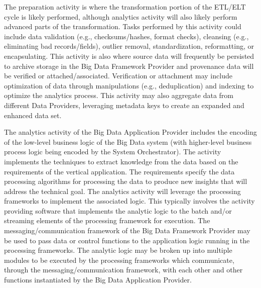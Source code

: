 \documentclass[9pt,twocolumn]{styles/osajnl}
\newcounter{subsubsubsection}[subsubsection]
\begin{document}

The preparation activity is where the transformation portion of the ETL/ELT cycle is likely performed, although analytics activity will also likely perform advanced parts of the transformation. Tasks performed by this activity could include data validation (e.g., checksums/hashes, format checks), cleansing (e.g., eliminating bad records/fields), outlier removal, standardization, reformatting, or encapsulating. This activity is also where source data will frequently be persisted to archive storage in the Big Data Framework Provider and provenance data will be verified or attached/associated. Verification or attachment may include optimization of data through manipulations (e.g., deduplication) and indexing to optimize the analytics process. This activity may also aggregate data from different Data Providers, leveraging metadata keys to create an expanded and enhanced data set.


The analytics activity of the Big Data Application Provider includes the encoding of the low-level business logic of the Big Data system (with higher-level business process logic being encoded by the System Orchestrator). The activity implements the techniques to extract knowledge from the data based on the requirements of the vertical application. The requirements specify the data processing algorithms for processing the data to produce new insights that will address the technical goal. The analytics activity will leverage the processing frameworks to implement the associated logic. This typically involves the activity providing software that implements the analytic logic to the batch and/or streaming elements of the processing framework for execution. The messaging/communication framework of the Big Data Framework Provider may be used to pass data or control functions to the application logic running in the processing frameworks. The analytic logic may be broken up into multiple modules to be executed by the processing frameworks which communicate, through the messaging/communication framework, with each other and other functions instantiated by the Big Data Application Provider.

\end{document}
